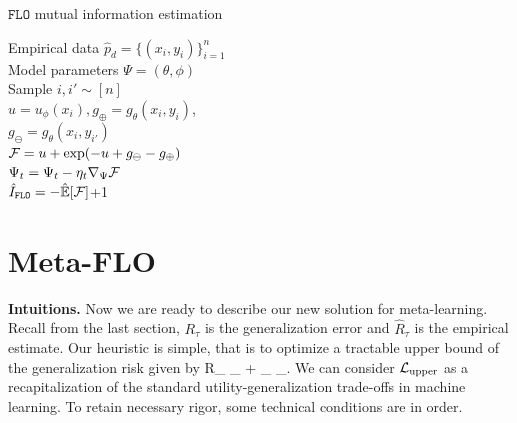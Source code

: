 \documentclass[nohyperref]{article}
\theoremstyle{plain}
\theoremstyle{definition}
\theoremstyle{remark}
\newcommand{\FLO}{\texttt{FLO}}
\newcommand{\upper}{\text{upper}}
\begin{document}
  \begin{algorithm}[t!]
\caption{$\FLO$ mutual information estimation}
   \label{alg:flo}
\begin{algorithmic}
\STATE Empirical data $\hat{p}_d = \{ (x_i, y_i) \}_{i=1}^n$ \\
[1pt]
\STATE Model parameters $\Psi = (\theta, \phi)$ \\
[1pt]
\STATE Sample $i,i' \sim [n]$ \\
[1pt]
\STATE $u = u_{\phi}(x_i), g_{\oplus} = g_{\theta}(x_i, y_i)$, \\
\STATE $g_{\ominus} = g_{\theta}(x_i, y_{i'})$\\
[1pt]
\STATE $\mathcal{F} = u + \exp(-u+g_{\ominus}-g_{\oplus})$\\
[1pt]
$\Psi_{t} = \Psi_{t} - \eta_t \nabla_{\Psi} \mathcal{F}$
\ENDFOR\\
\STATE $\hat{I}_{\FLO} = -\hat{\EE}[\CF]$+1
\end{algorithmic}
\end{algorithm}

\section{Meta-FLO}
\label{sec:metaflo}

{\bf Intuitions.} Now we are ready to describe our new solution for meta-learning. Recall from the last section, $R_{\tau}$ is the generalization error and $\hat{R}_{\tau}$ is the empirical estimate.  Our heuristic is simple, that is to optimize a tractable upper bound of the generalization risk given by
\beq
R_{\tau} \leq {}_{} + _{} \triangleq \CL_{\upper}. 
\label{eq:upper}
\eeq
We can consider $\CL_{\upper}$ as a recapitalization of the standard utility-generalization trade-offs in machine learning. To retain necessary rigor, some technical conditions are in order. 

\end{document}
